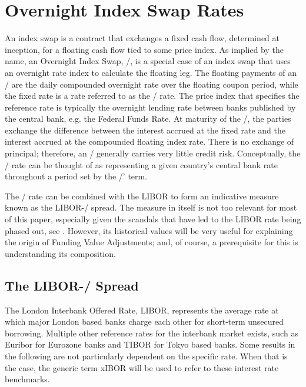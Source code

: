 \documentclass[main.tex]{subfiles}
\begin{document}
    \section{Overnight Index Swap Rates}
    
    An index swap is a contract that exchanges a fixed cash flow, determined at inception,
    for a floating cash flow tied to some price index.
    As implied by the name, an Overnight Index Swap, \OIS/, is a special case of an index swap
    that uses an overnight rate index to calculate the floating leg.
    The floating payments of an \OIS/ are the daily compounded overnight rate 
    over the floating coupon period,
    while the fixed rate is a rate referred to as the \OIS/ rate.
    The price index that specifies the reference rate is typically the overnight 
    lending rate between banks published by the central bank, e.g. the Federal Funds Rate.
    At maturity of the \OIS/, the parties exchange the difference between the interest accrued 
    at the fixed rate and the interest accrued at the compounded floating index rate.
    There is no exchange of principal; 
    therefore, an \OIS/ generally carries very little credit risk. 
    Conceptually, the \OIS/ rate can be thought of as representing a given country's
    central bank rate throughout a period set by the \OIS/' term. 

    The \OIS/ rate can be combined with the LIBOR to form an indicative measure
    known as the LIBOR-\OIS/ spread.
    The measure in itself is not too relevant for most of this paper,
    especially given the scandals that have led to the LIBOR rate being phased out,
    see \textcite{ForbesLibor}.
    However, its historical values will be very useful 
    for explaining the origin of Funding Value Adjustments;
    and, of course, a prerequisite for this is understanding its composition.

    \subsection{The LIBOR-\OIS/ Spread}

    The London Interbank Offered Rate, LIBOR, represents the average rate 
    at which major London based banks charge each other for short-term unsecured borrowing.
    Multiple other reference rates for the interbank market exists, 
    such as Euribor for Eurozone banks and TIBOR for Tokyo based banks.
    Some results in the following are not particularly dependent on the specific rate.
    When that is the case, the generic term xIBOR will be used 
    to refer to these interest rate benchmarks.
\end{document}
